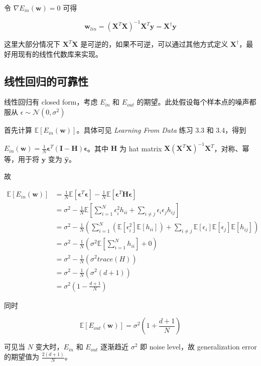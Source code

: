 \documentclass[a4paper]{article}
\begin{document}
令 $\nabla E_{in}(\mathbf{w}) = 0$ 可得

$$\mathbf{w}_{lin} = (\mathbf{X}^T\mathbf{X})^{-1}\mathbf{X}^T\mathbf{y} = \mathbf{X}^{\dagger}\mathbf{y}$$

这里大部分情况下 $\mathbf{X}^T\mathbf{X}$ 是可逆的，如果不可逆，可以通过其他方式定义 $\mathbf{X}^{\dagger}$，最好用现有的线性代数库来实现。


\subsection{线性回归的可靠性}
线性回归有 closed form，考虑 $E_{in}$ 和 $E_{out}$ 的期望。此处假设每个样本点的噪声都服从 $\epsilon \sim \mathcal{N}(0, \sigma^2)$

首先计算 $\mathbb{E}[E_{in}(\mathbf{w})]$。具体可见 \textit{Learning From Data} 练习 3.3 和 3.4，得到

$E_{in}(\mathbf{w}) = \frac{1}{N}\mathbf{\epsilon}^T(\mathbf{I - H})\mathbf{\epsilon}$。其中 $\mathbf{H}$ 为 hat matrix $\mathbf{X}(\mathbf{X}^T\mathbf{X})^{-1}\mathbf{X}^T$，对称、幂等，用于将 $\mathbf{y}$ 变为 $\hat{\mathbf{y}}$。

故

\begin{equation}
\begin{aligned}
\mathbb{E}[E_{in}(\mathbf{w})] &= \frac{1}{N}\mathbb{E}[\mathbf{\epsilon}^T\mathbf{\epsilon}] - \frac{1}{N}\mathbb{E}[\mathbf{\epsilon}^T\mathbf{H}\mathbf{\epsilon}] \\
&= \sigma^2 - \frac{1}{N}\mathbb{E}[\sum_{i=1}^{N}\epsilon_i^2h_{ii} + \sum_{i \neq j}\epsilon_i\epsilon_jh_{ij}] \\
&= \sigma^2 - \frac{1}{N}(\sum_{i=1}^{N}(\mathbb{E}[\epsilon_i^2]\mathbb{E}[h_{ii}]) + \sum_{i \neq j}\mathbb{E}[\epsilon_i]\mathbb{E}[\epsilon_j]\mathbb{E}[h_{ij}]) \\
&= \sigma^2 - \frac{1}{N}(\sigma^2\mathbb{E}[\sum_{i=1}^{N}h_{ii}] + 0) \\
&= \sigma^2 - \frac{1}{N}(\sigma^2 trace(H)) \\
&= \sigma^2 - \frac{1}{N}(\sigma^2(d + 1)) \\
&= \sigma^2(1 - \frac{d + 1}{N})
\end{aligned}
\end{equation}

同时

$$\mathbb{E}[E_{out}(\mathbf{w})] = \sigma^2(1 + \frac{d + 1}{N})$$

可见当 $N$ 变大时，$E_{in}$ 和 $E_{out}$ 逐渐趋近 $\sigma^2$ 即 noise level，故 generalization error 的期望值为 $\frac{2(d+1)}{N}$。
\end{document}
